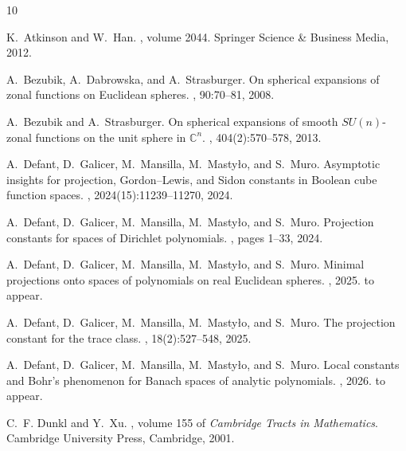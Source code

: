 \documentclass[12pt]{amsart}
\numberwithin{subsection}{section}
\theoremstyle{definition}
\theoremstyle{remark}
\begin{document}



\begin{thebibliography}{10}

K.~Atkinson and W.~Han.
, volume 2044.
\newblock Springer Science \& Business Media, 2012.

A.~Bezubik, A.~Dabrowska, and A.~Strasburger.
\newblock On spherical expansions of zonal functions on {E}uclidean spheres.
, 90:70--81, 2008.

A.~Bezubik and A.~Strasburger.
\newblock On spherical expansions of smooth {$SU (n)$}-zonal functions on the unit sphere in {$\mathbb C^n$}.
, 404(2):570--578, 2013.

A.~Defant, D.~Galicer, M.~Mansilla, M.~Masty{\l}o, and S.~Muro.
\newblock Asymptotic insights for projection, {G}ordon--{L}ewis, and {S}idon constants in {B}oolean cube function spaces.
, 2024(15):11239--11270, 2024.

A.~Defant, D.~Galicer, M.~Mansilla, M.~Masty{\l}o, and S.~Muro.
\newblock Projection constants for spaces of {D}irichlet polynomials.
, pages 1--33, 2024.

A.~Defant, D.~Galicer, M.~Mansilla, M.~Masty{\l}o, and S.~Muro.
\newblock Minimal projections onto spaces of polynomials on real {E}uclidean spheres.
, 2025.
\newblock to appear.

A.~Defant, D.~Galicer, M.~Mansilla, M.~Masty{\l}o, and S.~Muro.
\newblock The projection constant for the trace class.
, 18(2):527--548, 2025.

A.~Defant, D.~Galicer, M.~Mansilla, M.~Masty{\l}o, and S.~Muro.
\newblock Local constants and {B}ohr's phenomenon for {B}anach spaces of analytic polynomials.
, 2026.
\newblock to appear.

C.~F. Dunkl and Y.~Xu.
, volume 155 of {\em Cambridge Tracts in Mathematics}.
\newblock Cambridge University Press, Cambridge, 2001.


\end{thebibliography}
\end{document}
